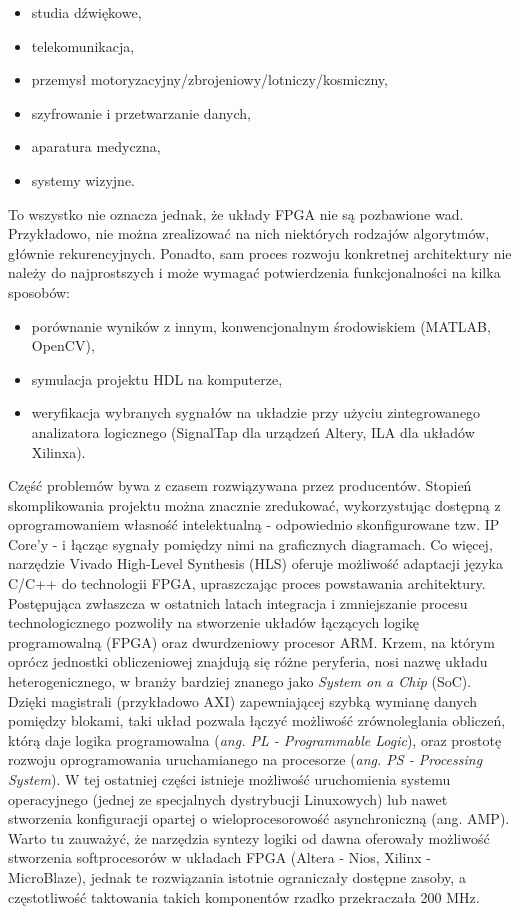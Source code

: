 \begin{itemize}
	\item studia dźwiękowe,
	\item telekomunikacja,
	\item przemysł motoryzacyjny/zbrojeniowy/lotniczy/kosmiczny,
	\item szyfrowanie i przetwarzanie danych,
	\item aparatura medyczna,
	\item systemy wizyjne.
\end{itemize}
To wszystko nie oznacza jednak, że układy FPGA nie są pozbawione wad. Przykładowo, nie można zrealizować na nich niektórych rodzajów algorytmów, głównie rekurencyjnych. Ponadto, sam proces rozwoju konkretnej architektury nie należy do najprostszych i może wymagać potwierdzenia funkcjonalności na kilka sposobów:
\begin{itemize}
	\item porównanie wyników z innym, konwencjonalnym środowiskiem (MATLAB, OpenCV),
	\item symulacja projektu HDL na komputerze,
	\item weryfikacja wybranych sygnałów na układzie przy użyciu zintegrowanego analizatora logicznego (SignalTap dla urządzeń Altery, ILA dla układów Xilinxa).
\end{itemize}
Część problemów bywa z czasem rozwiązywana przez producentów. Stopień skomplikowania projektu można znacznie zredukować, wykorzystując dostępną z oprogramowaniem własność intelektualną - odpowiednio skonfigurowane tzw. IP Core'y - i łącząc sygnały pomiędzy nimi na graficznych diagramach. Co więcej, narzędzie Vivado High-Level Synthesis (HLS) oferuje możliwość adaptacji języka C/C++ do technologii FPGA, upraszczając proces powstawania architektury. \newline Postępująca zwłaszcza w ostatnich latach integracja i zmniejszanie procesu technologicznego pozwoliły na stworzenie układów łączących logikę programowalną (FPGA) oraz dwurdzeniowy procesor ARM. Krzem, na którym oprócz jednostki obliczeniowej znajdują się różne peryferia, nosi nazwę układu heterogenicznego, w branży bardziej znanego jako \textit{System on a Chip} (SoC). Dzięki magistrali (przykładowo AXI) zapewniającej szybką wymianę danych pomiędzy blokami, taki układ pozwala łączyć możliwość zrównoleglania obliczeń, którą daje logika programowalna (\textit{ang. PL - Programmable Logic}), oraz prostotę rozwoju oprogramowania uruchamianego na procesorze (\textit{ang. PS - Processing System}). W tej ostatniej części istnieje możliwość uruchomienia systemu operacyjnego (jednej ze specjalnych dystrybucji Linuxowych) lub nawet stworzenia konfiguracji opartej o wieloprocesorowość asynchroniczną (ang. AMP). Warto tu zauważyć, że narzędzia syntezy logiki od dawna oferowały możliwość stworzenia softprocesorów w układach FPGA (Altera - Nios, Xilinx - MicroBlaze), jednak te rozwiązania istotnie ograniczały dostępne zasoby, a częstotliwość taktowania takich komponentów rzadko przekraczała 200 MHz. \newline


